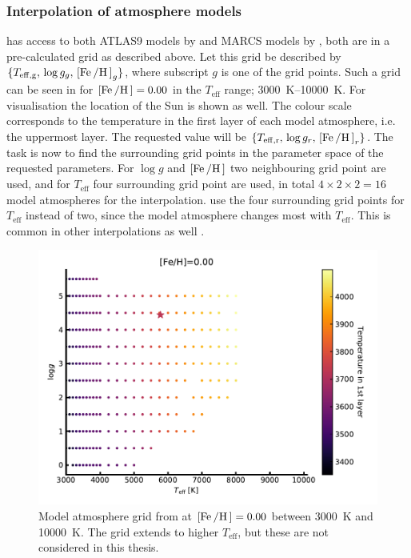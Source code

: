 \subsubsection{Interpolation of atmosphere models}
\label{sec:interpolation}

 has access to both ATLAS9 models by \citet{Kurucz1993} and MARCS models by
\citet{Gustafson2008}, both are in a pre-calculated grid as described above. Let this grid be
described by $\{T_\mathrm{eff,g},\, \log g_g,\, [\ion{Fe}/\ion{H}]_g\}$, where subscript $g$ is one
of the grid points. Such a grid can be seen in  for $[\ion{Fe}/\ion{H}]=0.00$ in the
$T_\mathrm{eff}$ range; \SIrange{3000}{10000}{K}. For visualisation the location of the Sun is
shown as well. The colour scale corresponds to the temperature in the first layer of each model
atmosphere, i.e. the uppermost layer. The requested value will be $\{T_\mathrm{eff,r},\,\log
g_r,\,[\ion{Fe}/\ion{H}]_r\}$. The task is now to find the surrounding grid points in the parameter
space of the requested parameters. For $\log g$ and $[\ion{Fe}/\ion{H}]$ two neighbouring grid point
are used, and for $T_\mathrm{eff}$ four surrounding grid point are used, in total
$4\times2\times2=16$ model atmospheres for the interpolation.  use the four surrounding
grid points for $T_\mathrm{eff}$ instead of two, since the model atmosphere changes most with
$T_\mathrm{eff}$. This is common in other interpolations as well \citep[see e.g.][]{Valenti1996}.

\begin{figure}[htpb!]
    \centering
    \includegraphics[width=0.85\linewidth]{figures/model_atmosphere.pdf}
    \caption{Model atmosphere grid from \citet{Kurucz1993} at $[\ion{Fe}/\ion{H}]=0.00$ between
             \SI{3000}{K} and \SI{10000}{K}. The grid extends to higher $T_\mathrm{eff}$, but these
             are not considered in this thesis.}
    \label{fig:grid}
\end{figure}

